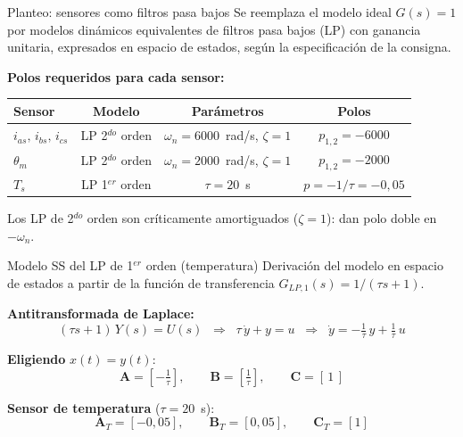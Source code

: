 \documentclass[aspectratio=169,t]{beamer}
\begin{document}
\begin{frame}{Planteo: sensores como filtros pasa bajos}
{\small\color{uncGray}Se reemplaza el modelo ideal $G(s)=1$ por modelos dinámicos equivalentes de filtros pasa bajos (LP) con ganancia unitaria, expresados en espacio de estados, según la especificación de la consigna.}\par
\vspace{3mm}

\textbf{Polos requeridos para cada sensor:}
\vspace{1mm}

\centering
\footnotesize
\renewcommand{\arraystretch}{1.2}
\begin{tabular}{|l|c|c|c|}
\hline
\textbf{Sensor} & \textbf{Modelo} & \textbf{Parámetros} & \textbf{Polos} \\
\hline
$i_{as},\,i_{bs},\,i_{cs}$ & LP 2$^{do}$ orden & $\omega_n = 6000$~rad/s, $\zeta = 1$ & $p_{1,2} = -6000$ \\
$\theta_m$ & LP 2$^{do}$ orden & $\omega_n = 2000$~rad/s, $\zeta = 1$ & $p_{1,2} = -2000$ \\
$T_s$ & LP 1$^{er}$ orden & $\tau = 20$~s & $p = -1/\tau = -0{,}05$ \\
\hline
\end{tabular}
\normalsize

\vspace{4mm}
{\small Los LP de 2$^{do}$ orden son críticamente amortiguados ($\zeta=1$): dan polo doble en $-\omega_n$.}
\end{frame}

\begin{frame}{Modelo SS del LP de 1$^{er}$ orden (temperatura)}
{\small\color{uncGray}Derivación del modelo en espacio de estados a partir de la función de transferencia $G_{LP,1}(s)=1/(\tau s + 1)$.}\par
\vspace{3mm}

\textbf{Antitransformada de Laplace:}
\begin{equation*}
(\tau s + 1)\,Y(s) = U(s)
\;\;\Longrightarrow\;\;
\tau\,\dot y + y = u
\;\;\Longrightarrow\;\;
\dot y = -\tfrac{1}{\tau}\,y + \tfrac{1}{\tau}\,u
\end{equation*}

\textbf{Eligiendo} $x(t) = y(t)$:
\begin{equation*}
\bm{A} = \left[-\tfrac{1}{\tau}\right],
\qquad
\bm{B} = \left[\tfrac{1}{\tau}\right],
\qquad
\bm{C} = [\,1\,]
\end{equation*}

\textbf{Sensor de temperatura} ($\tau = 20$~s):
\begin{equation*}
\bm{A}_T = [-0{,}05],
\qquad
\bm{B}_T = [0{,}05],
\qquad
\bm{C}_T = [1]
\end{equation*}
\end{frame}
\end{document}
